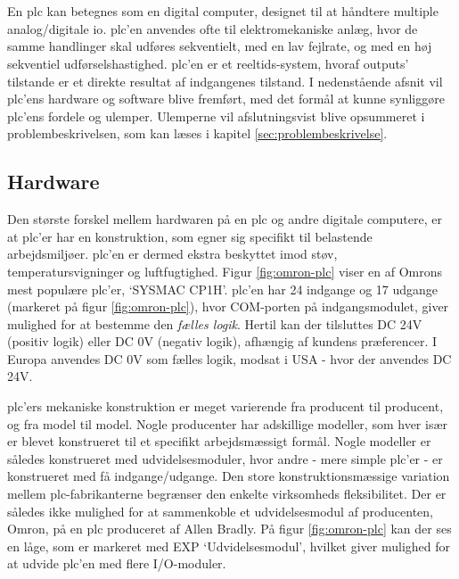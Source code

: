 \section{}
En \gls{plc} kan betegnes som en digital computer, designet til at håndtere multiple analog/digitale \gls{io}. \gls{plc}'en anvendes ofte til elektromekaniske anlæg, hvor de samme handlinger skal udføres sekventielt, med en lav fejlrate, og med en høj sekventiel udførselshastighed. \gls{plc}'en er et reeltids-system, hvoraf outputs' tilstande er et direkte resultat af indgangenes tilstand. I nedenstående afsnit vil \gls{plc}'ens hardware og software blive fremført, med det formål at kunne synliggøre \gls{plc}'ens fordele og ulemper. Ulemperne vil afslutningsvist blive opsummeret i problembeskrivelsen, som kan læses i kapitel \ref{sec:problembeskrivelse}. \cite{PLC_hardware_desc}

\subsection{Hardware}
\label{subsec:pa-hardware}
Den største forskel mellem hardwaren på en \gls{plc} og andre digitale computere, er at \gls{plc}'er har en konstruktion, som egner sig specifikt til belastende arbejdsmiljøer. \gls{plc}'en er dermed ekstra beskyttet imod støv, temperatursvigninger og luftfugtighed. Figur \ref{fig:omron-plc} viser en af Omrons mest populære \gls{plc}'er, \enquote*{SYSMAC CP1H}. \gls{plc}'en har 24 indgange og 17 udgange (markeret på figur \ref{fig:omron-plc}), hvor COM-porten på indgangsmodulet, giver mulighed for at bestemme den \textit{fælles logik}. Hertil kan der tilsluttes DC 24V (positiv logik) eller DC 0V (negativ logik), afhængig af kundens præferencer. I Europa anvendes DC 0V som fælles logik, modsat i USA - hvor der anvendes DC 24V. 


\noindent \gls{plc}'ers mekaniske konstruktion er meget varierende fra producent til producent, og fra model til model. Nogle producenter har adskillige modeller, som hver især er blevet konstrueret til et specifikt arbejdsmæssigt formål. Nogle modeller er således konstrueret med udvidelsesmoduler, hvor andre - mere simple \gls{plc}'er - er konstrueret med få indgange/udgange. 
Den store konstruktionsmæssige variation mellem \gls{plc}-fabrikanterne begrænser den enkelte virksomheds fleksibilitet. Der er således ikke mulighed for at sammenkoble et udvidelsesmodul af producenten, Omron, på en \gls{plc} produceret af Allen Bradly\cite{PLC-comb}. På figur \ref{fig:omron-plc} kan der ses en låge, som er markeret med EXP \enquote*{Udvidelsesmodul}, hvilket giver mulighed for at udvide \gls{plc}'en med flere I/O-moduler. 

